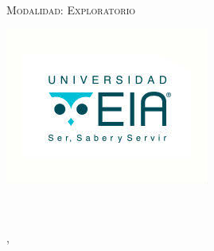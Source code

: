 

\thispagestyle{empty}


	\begin{center}
		\Large \scshape
		\tfgtitlename \\
		\bigskip
		Modalidad: Exploratorio
	\end{center}

	\bigskip



	\bigskip 

	\bigskip \bigskip \bigskip \bigskip \bigskip
	
	\bigskip \bigskip \bigskip 


	\begin{center}
		\Large \scshape
		\tfgauthorname
	\end{center}

	\bigskip \bigskip \bigskip  

	\vfill

	\begin{center}
		\Large \scshape
		\tfgtutorname
	\end{center}

	\bigskip \bigskip 
\begin{center}
	\includegraphics{Figuras/Logo_EIA}
\end{center}

	\begin{center}
		\large \scshape
		\tfgUniversidad \\%
		\tfgCarrera\\
		
		\tfgCiudad, \tfganno %
	\end{center}

\blankpage